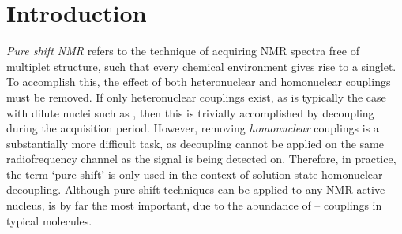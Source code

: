 \section{Introduction}
\label{sec:pureshift/introduction}

\textit{Pure shift NMR} refers to the technique of acquiring NMR spectra free of multiplet structure, such that every chemical environment gives rise to a singlet.\autocite{Zangger2015PNMRS}
To accomplish this, the effect of both heteronuclear and homonuclear couplings must be removed.
If only heteronuclear couplings exist, as is typically the case with dilute nuclei such as \carbon{}, then this is trivially accomplished by decoupling during the acquisition period.
However, removing \textit{homonuclear} couplings is a substantially more difficult task, as decoupling cannot be applied on the same radiofrequency channel as the signal is being detected on.
Therefore, in practice, the term `pure shift' is only used in the context of solution-state homonuclear decoupling.
Although pure shift techniques can be applied to any NMR-active nucleus, \proton{} is by far the most important, due to the abundance of \proton{}--\proton{} couplings in typical molecules.
